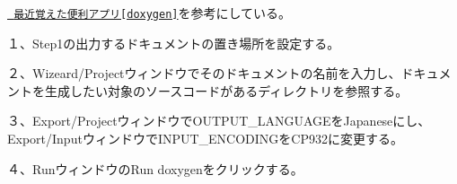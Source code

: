 \href{https://qiita.com/wakaba130/items/faa6671bd5c954cb2d02\#\%E4\%BD\%BF\%E3\%81\%84\%E6\%96\%B9doxygen\%E5\%AE\%9F\%E8\%A1\%8C\%E7\%B7\%A8}{\texttt{ 最近覚えた便利アプリ\mbox{[}doxygen\mbox{]}}}を参考にしている。

１、\+Step1の出力するドキュメントの置き場所を設定する。

２、\+Wizeard/\+Projectウィンドウでそのドキュメントの名前を入力し、ドキュメントを生成したい対象のソースコードがあるディレクトリを参照する。

３、\+Export/\+Projectウィンドウで\+O\+U\+T\+P\+U\+T\+\_\+\+L\+A\+N\+G\+U\+A\+G\+Eを\+Japaneseにし、\+Export/\+Inputウィンドウで\+I\+N\+P\+U\+T\+\_\+\+E\+N\+C\+O\+D\+I\+N\+Gを\+C\+P932に変更する。

４、\+Runウィンドウの\+Run doxygenをクリックする。 